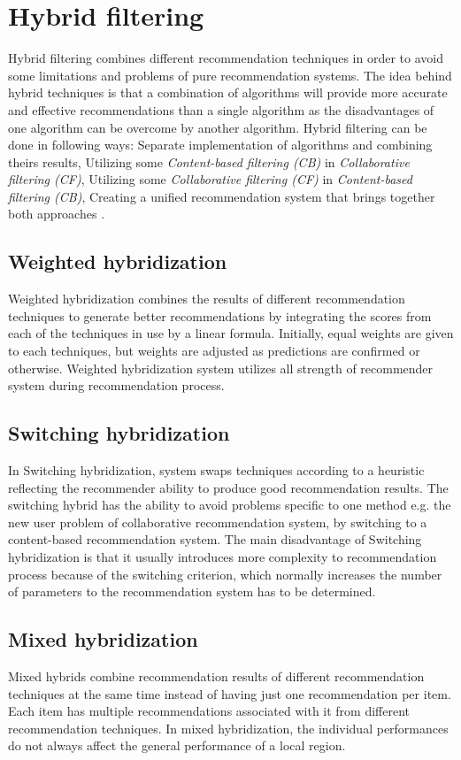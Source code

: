 \documentclass[conference]{IEEEtran}
\begin{document}
\section{Hybrid filtering}
Hybrid filtering combines different recommendation
techniques in order to avoid some limitations and problems of pure recommendation systems. The idea behind hybrid techniques is that a combination of algorithms will provide more accurate and effective recommendations than a single algorithm as the disadvantages of one algorithm can be overcome by another algorithm. Hybrid filtering can be done in following ways: Separate implementation of algorithms and combining theirs results, Utilizing some \textit{Content-based filtering (CB)} in \textit{Collaborative filtering (CF)}, Utilizing some \textit{Collaborative filtering (CF)} in \textit{Content-based filtering (CB)}, Creating a uniﬁed recommendation system that brings together both approaches \cite{b1}.

\subsection{Weighted hybridization}\label{AA}
Weighted hybridization combines the results of different recommendation techniques to generate better recommendations by integrating the scores from each of the techniques in use by a linear formula. Initially, equal weights are given to each techniques, but weights are adjusted as predictions are confirmed or otherwise. Weighted hybridization system utilizes all strength of recommender system during recommendation process.

\subsection{Switching hybridization}\label{BB}
In Switching hybridization, system swaps techniques according to a heuristic reflecting the recommender ability to produce good recommendation results. The switching hybrid has the ability
to avoid problems speciﬁc to one method e.g. the new user
problem of collaborative recommendation system, by switching to a content-based recommendation system. The main disadvantage of
Switching hybridization is that it usually introduces more complexity
to recommendation process because of the switching criterion, which normally increases the number of parameters to the recommendation system has to be determined.

\subsection{Mixed hybridization}\label{CC}
Mixed hybrids combine recommendation results of different
recommendation techniques at the same time instead of having
just one recommendation per item. Each item has multiple recommendations associated with it from different recommendation techniques. In mixed hybridization, the individual performances do not always affect the general performance of a local region. 
\end{document}
